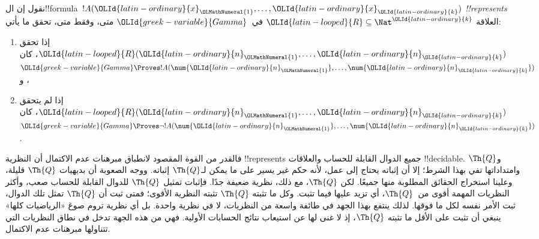 \documentclass[../../../include/open-logic-section]{subfiles}
\begin{document}
\begin{defn}
نقول إن ال!!{formula}~$!A(\OLId{latin-ordinary}{x}_\OLMathNumeral{1},\dots,\OLId{latin-ordinary}{x}_\OLId{latin-ordinary}{k})$ \emph{!!{represents}} العلاقة
$\OLId{latin-looped}{R}\subseteq\Nat^\OLId{latin-ordinary}{k}$ في~$\OLId{greek-variable}{Gamma}$ متى، وفقط متى، تحقق ما يأتي:
\begin{enumerate}
\item إذا تحقق $\OLId{latin-looped}{R}(\OLId{latin-ordinary}{n}_\OLMathNumeral{1},\dots,\OLId{latin-ordinary}{n}_\OLId{latin-ordinary}{k})$، كان
$\OLId{greek-variable}{Gamma}\Proves !A(\num{\OLId{latin-ordinary}{n}_\OLMathNumeral{1}},\dots,\num{\OLId{latin-ordinary}{n}_\OLId{latin-ordinary}{k}})$، و
\item إذا لم يتحقق $\OLId{latin-looped}{R}(\OLId{latin-ordinary}{n}_\OLMathNumeral{1},\dots,\OLId{latin-ordinary}{n}_\OLId{latin-ordinary}{k})$، كان $\OLId{greek-variable}{Gamma}\Proves\lnot
!A(\num{\OLId{latin-ordinary}{n}_\OLMathNumeral{1}},\dots,\num{\OLId{latin-ordinary}{n}_\OLId{latin-ordinary}{k}})$.
\end{enumerate}
\end{defn}

فالقدر من القوة المقصود لانطباق مبرهنات عدم الاكتمال
أن النظرية !!{represents} جميع الدوال القابلة للحساب
والعلاقات !!{decidable}. و$\Th{Q}$ وامتداداتها
تفي بهذا الشرط؛ إلا أن إثباته يحتاج إلى عمل،
لأنه حكم غير يسير على ما يمكن لـ$\Th{Q}$ إثباته.
ووجه الصعوبة أن بديهيات $\Th{Q}$ قليلة،
وعلينا استخراج الحقائق المطلوبة منها جميعًا.
لكن $\Th{Q}$، مع ذلك، نظرية ضعيفة جدًا.
فإثبات تمثيل $\Th{Q}$ للدوال القابلة للحساب
صعب، وأكثر النظريات المهمة أقوى من~$\Th{Q}$،
أي تزيد عليها فيما تثبت. وكل ما تثبته
$\Th{Q}$ تثبته النظرية الأقوى؛ فمتى ثبت
أن $\Th{Q}$ تمثل تلك الدوال، ثبت الأمر نفسه
لكل ما فوقها. لذلك ينتفع بهذا الجهد في طائفة
واسعة من النظريات، لا في نظرية واحدة.
بل أي نظرية تروم صوغ «الرياضيات كلها» ينبغي
أن تثبت على الأقل ما تثبته $\Th{Q}$،
إذ لا غنى لها عن استيعاب نتائج الحسابات
الأولية. فهي من هذه الجهة تدخل في نطاق
النظريات التي تتناولها مبرهنات عدم الاكتمال.
\end{document}
